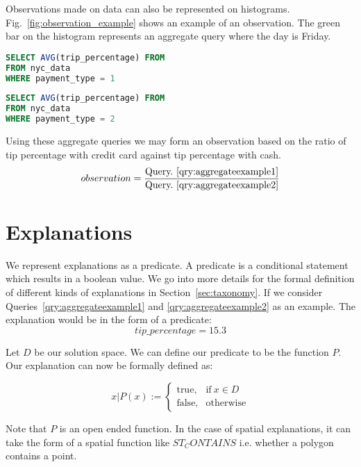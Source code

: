 Observations made on data can also be represented on histograms. Fig.~\ref{fig:observation_example} shows an example of an observation. The green bar on the histogram represents an aggregate query where the day is Friday.

\renewcommand{\lstlistingname}{Query}%
\begin{lstlisting}[language=SQL, caption=Aggregate Query for average tip percentage with credit cards, label=qry:aggregateexample1]
SELECT AVG(trip_percentage) FROM
FROM nyc_data
WHERE payment_type = 1
\end{lstlisting}

\renewcommand{\lstlistingname}{Query}%
\begin{lstlisting}[language=SQL, caption=Aggregate Query for average tip percentage with cash, label=qry:aggregateexample2]
SELECT AVG(trip_percentage) FROM
FROM nyc_data
WHERE payment_type = 2
\end{lstlisting}

Using these aggregate queries we may form an observation based on the ratio of tip percentage with credit card against tip percentage with cash.
$$observation = \frac{\textnormal{Query.~\ref{qry:aggregateexample1}}}{\textnormal{Query.~\ref{qry:aggregateexample2}}}$$


\section{Explanations}
We represent explanations as a predicate. A predicate is a conditional statement which results in a boolean value. We go into more details for the formal definition of different kinds of explanations in Section~\ref{sec:taxonomy}. If we consider Queries~\ref{qry:aggregateexample1} and \ref{qry:aggregateexample2} as an example. The explanation would be in the form of a predicate:
$$tip\_percentage = 15.3$$

Let $D$ be our solution space. We can define our predicate to be the function $P$. Our explanation can now be formally defined as:

\begin{equation}
x|P(x):=
    \begin{cases}
      \text{true}, & \text{if}\ x \in D \\
      \text{false}, & \text{otherwise}
    \end{cases}
\end{equation}

Note that $P$ is an open ended function. In the case of spatial explanations, it can take the form of a spatial function like $ST_CONTAINS$ i.e. whether a polygon contains a point.


